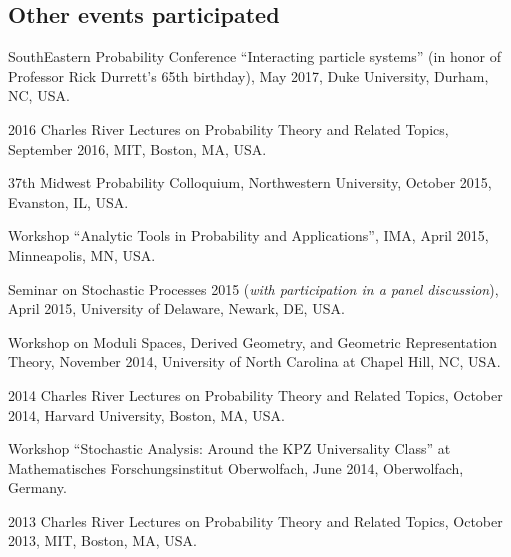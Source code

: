 \documentclass[letterpaper,11pt]{article}
\begin{document}
\subsection*{Other events participated}

\begin{etaremune}
	\item
	      SouthEastern Probability Conference
	      ``Interacting particle systems''
	      (in honor of Professor Rick Durrett's 65th birthday),
	      May 2017,
	      Duke University, Durham, NC, USA.

	\item
	      2016 Charles River Lectures on Probability Theory and Related
	      Topics,
	      September 2016, MIT, Boston, MA, USA.


	\item
	      37th Midwest Probability Colloquium, Northwestern University,
	      October 2015,
	      Evanston, IL, USA.

	\item
	      Workshop ``Analytic Tools in Probability and Applications'',
	      IMA, April
	      2015, Minneapolis, MN, USA.

	\item
	      Seminar on Stochastic Processes 2015 (\emph{with participation
		      in a
		      panel discussion}),
	      April 2015, University of Delaware,
	      Newark, DE, USA.

	\item
	      Workshop on Moduli Spaces, Derived Geometry, and Geometric
	      Representation Theory, November 2014, University of North
	      Carolina at Chapel
	      Hill, NC, USA.

	\item
	      2014 Charles River Lectures on Probability Theory and Related
	      Topics,
	      October 2014, Harvard University, Boston, MA, USA.

	\item
	      Workshop ``Stochastic Analysis: Around the KPZ Universality
	      Class'' at
	      Mathematisches Forschungsinstitut Oberwolfach,
	      June 2014, Oberwolfach, Germany.

	\item
	      2013 Charles River Lectures on Probability Theory and Related
	      Topics,
	      October 2013, MIT, Boston, MA, USA.


\end{etaremune}
\end{document}

